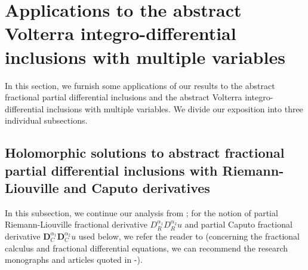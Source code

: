 \documentclass{amsart}
\theoremstyle{definition}
\theoremstyle{remark}
\numberwithin{equation}{section}
\begin{document}
\section{Applications to the abstract Volterra integro-differential inclusions with multiple variables}\label{dzubre}

In this section, we furnish some applications of our results to the abstract fractional partial differential inclusions and the abstract Volterra integro-differential inclusions with multiple variables. We divide our exposition into three individual subsections. 

\subsection{Holomorphic solutions to abstract fractional partial differential inclusions with Riemann-Liouville and Caputo derivatives}\label{nulice}

In this subsection, we continue our analysis from \cite[Subsection 6.1]{axioms}; for the notion of partial Riemann-Liouville fractional derivative
$D_{R}^{\alpha_{1}}  D_{R}^{\alpha_{2}}u$ and partial Caputo fractional derivative ${\mathbf D}_{C}^{\alpha_{1}}{\mathbf D}_{C}^{\alpha_{2}}u$ used below, we refer the reader to \cite[Section 2]{axioms}  (concerning the fractional calculus and fractional differential equations, we can recommend the research monographs and articles quoted in \cite{knjigaho}-\cite{funkcionalne}).
\end{document}
